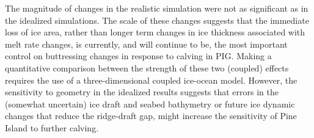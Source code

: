 \documentclass[draft]{agujournal2019}
\begin{document}
The magnitude of changes in the realistic simulation were not as significant as in the idealized simulations. The scale of these changes suggests that the immediate loss of ice area, rather than longer term changes in ice thickness associated with melt rate changes, is currently, and will continue to be, the most important control on buttressing changes in response to calving in PIG. Making a quantitative comparison between the strength of these two (coupled) effects requires the use of a three-dimensional coupled ice-ocean model. However, the sensitivity to geometry in the idealized results suggests that errors in the (somewhat uncertain) ice draft and seabed bathymetry or future ice dynamic changes that reduce the ridge-draft gap, might increase the sensitivity of Pine Island to further calving.




%


%
%
%
%
\end{document}
